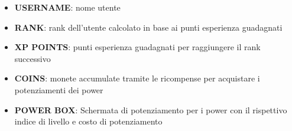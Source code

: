 \documentclass[a4paper,12pt]{report}
\begin{document}
\begin{itemize}
\item \textbf{USERNAME}:     nome utente
\item \textbf{RANK}:     rank dell'utente calcolato in base ai punti esperienza guadagnati
\item \textbf{XP POINTS}:     punti esperienza guadagnati per raggiungere il rank successivo
\item \textbf{COINS}: 	monete accumulate tramite le ricompense per acquistare i potenziamenti dei power
\item \textbf{POWER BOX}: 	Schermata di potenziamento per i power con il rispettivo indice di livello e costo di potenziamento
\end{itemize}
\end{document}
